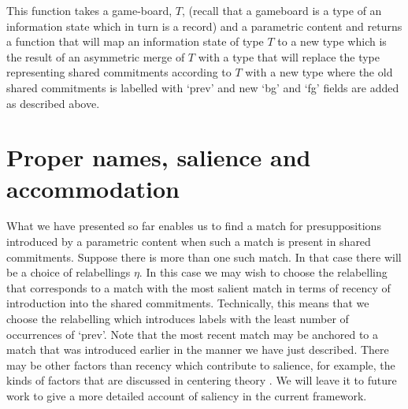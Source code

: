 This function takes a game-board, $T$, (recall that a gameboard is a type of
an information state which in turn is a record) and a parametric
content and returns a function that will map an information state of
type $T$ to a new type which is the result of an asymmetric merge of
$T$ with a type that will replace the type representing shared
commitments according to $T$ with a new type where the old shared
commitments is labelled with `prev'  and new `bg' and `fg' fields are
added as described above.

  


\section{Proper names, salience and accommodation}
\label{sec:accommodation}

What we have presented so far enables us to find a match for
presuppositions introduced by a parametric content when such a match
is present in shared commitments.  Suppose there is more than one such
match.  In that case there will be a choice of relabellings $\eta$.
In this case we may wish to choose the relabelling that corresponds to
a match with the most salient match in terms of recency of
introduction into the shared commitments.  Technically, this means
that we choose the relabelling which introduces labels with the least
number of occurrences of `prev'.  Note that the most recent match may
be anchored to a match that was introduced earlier in the manner we
have just described.  There may be other factors than recency which
contribute to salience, for example, the kinds of factors that are
discussed in centering theory \citep{JoshiWeinstein1981,GroszJoshiWeinstein1983,GroszJoshiWeinstein1995,WalkerJoshiPrince1998,PoesioStevensonEugenioHitzeman2004}.  We will leave it to future work to give a
more detailed account of saliency in the current framework.


